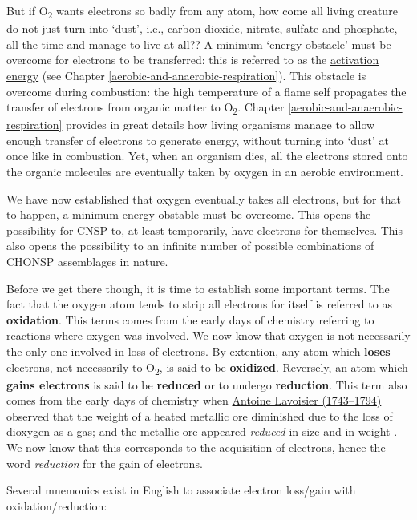 \documentclass[]{book}
\theoremstyle{definition}
\theoremstyle{definition}
\theoremstyle{definition}
\theoremstyle{remark}
\begin{document}
But if O\textsubscript{2} wants electrons so badly from any atom, how
come all living creature do not just turn into `dust', i.e., carbon
dioxide, nitrate, sulfate and phosphate, all the time and manage to live
at all?? A minimum `energy obstacle' must be overcome for electrons to
be transferred: this is referred to as the
\protect\hyperlink{generating-energy-transfer-of-electrons}{activation
energy} (see Chapter \ref{aerobic-and-anaerobic-respiration}). This
obstacle is overcome during combustion: the high temperature of a flame
self propagates the transfer of electrons from organic matter to
O\textsubscript{2}. Chapter \ref{aerobic-and-anaerobic-respiration}
provides in great details how living organisms manage to allow enough
transfer of electrons to generate energy, without turning into `dust' at
once like in combustion. Yet, when an organism dies, all the electrons
stored onto the organic molecules are eventually taken by oxygen in an
aerobic environment.

We have now established that oxygen eventually takes all electrons, but
for that to happen, a minimum energy obstable must be overcome. This
opens the possibility for CNSP to, at least temporarily, have electrons
for themselves. This also opens the possibility to an infinite number of
possible combinations of CHONSP assemblages in nature.

Before we get there though, it is time to establish some important
terms. The fact that the oxygen atom tends to strip all electrons for
itself is referred to as \textbf{oxidation}. This terms comes from the
early days of chemistry referring to reactions where oxygen was
involved. We now know that oxygen is not necessarily the only one
involved in loss of electrons. By extention, any atom which
\textbf{loses} electrons, not necessarily to O\textsubscript{2}, is said
to be \textbf{oxidized}. Reversely, an atom which \textbf{gains
electrons} is said to be \textbf{reduced} or to undergo
\textbf{reduction}. This term also comes from the early days of
chemistry when
\href{https://en.wikipedia.org/wiki/Antoine_Lavoisier}{Antoine Lavoisier
(1743--1794)} observed that the weight of a heated metallic ore
diminished due to the loss of dioxygen as a gas; and the metallic ore
appeared \emph{reduced} in size and in weight
\citep{Wikipedia_contributors2018-dg}. We now know that this corresponds
to the acquisition of electrons, hence the word \emph{reduction} for the
gain of electrons.

Several mnemonics exist in English to associate electron loss/gain with
oxidation/reduction:
\end{document}
